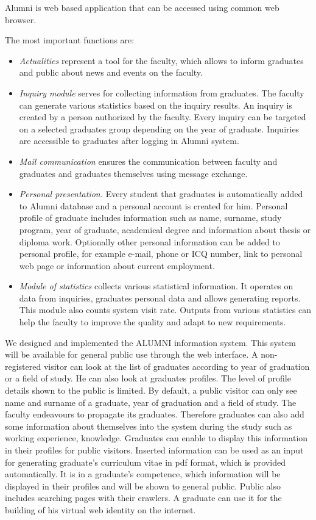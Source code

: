 \documentclass{iitsrc}
\begin{document}
Alumni is web based application that can be accessed using common web browser.  

The most important functions are:

\begin{itemize}
\item {\em Actualities} 
represent a tool for the faculty, which allows to inform graduates and public about news and events on the faculty.

\item {\em Inquiry module}
serves for collecting information from graduates. The faculty can generate various statistics based on the inquiry results. An inquiry is created by a person authorized by the faculty. Every inquiry can be targeted on a selected graduates group depending on the year of graduate. Inquiries are accessible to graduates after logging in Alumni system.

\item {\em Mail communication} ensures the communication between faculty and graduates and graduates themselves using message exchange.

\item {\em Personal presentation.}
Every student that graduates is automatically added to Alumni database and a personal account is created for him. Personal profile of graduate includes information such as name, surname, study program, year of graduate, academical degree and information about thesis or diploma work. Optionally other personal information can be added to personal profile, for example e-mail, phone or ICQ number, link to personal web page or information about current employment. 

\item {\em Module of statistics}
collects various statistical information. It operates on data from inquiries, graduates personal data and allows generating reports. This module also counts system visit rate. Outputs from various statistics can help the faculty to improve the quality and adapt to new requirements.
\end{itemize}

We designed and implemented the ALUMNI information system. This system will be available for general public use through the web interface. A non-registered visitor can look at the list of graduates according to year of graduation or a field of study. He can also look at graduates profiles. The level of profile details shown to the public is limited. By default, a public visitor can only see name and surname of a graduate, year of graduation and a field of study. The faculty endeavours to propagate its graduates. Therefore graduates can also add some information about themselves into the system during the study such as working experience, knowledge. Graduates can enable to display this information in their profiles for public visitors. Inserted information can be used as an input for generating graduate's curriculum vitae in pdf format, which is provided automatically. It is in a graduate's competence, which information will be displayed in their profiles and will be shown to general public. Public also includes searching pages with their crawlers. A graduate can use it for the building of his virtual web identity on the internet. 
\end{document}
